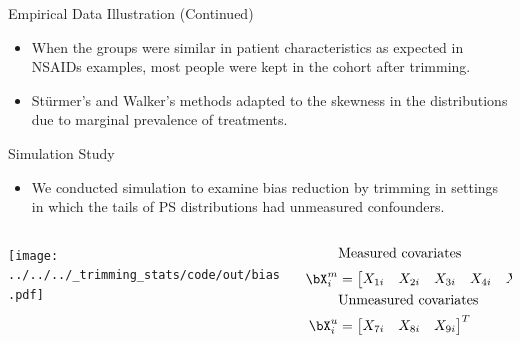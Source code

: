 \documentclass[final]{beamer}
\begin{document}
\begin{frame}[label={sec:org6cddcf1}]{}
\begin{columns}
\begin{column}[t]{0.48\columnwidth}
\begin{block}{Empirical Data Illustration (Continued)}
\begin{exampleblock}{}
\large
\begin{itemize}
\item When the groups were similar in patient characteristics as expected in NSAIDs examples, most people were kept in the cohort after trimming.
\item Stürmer's and Walker's methods adapted to the skewness in the distributions due to marginal prevalence of treatments.
\end{itemize}
\end{exampleblock}
\end{block}

\begin{block}{Simulation Study}
\large
\begin{itemize}
\item We conducted simulation to examine bias reduction by trimming in settings in which the tails of PS distributions had unmeasured confounders.
\end{itemize}

\vspace{-2cm}
\begin{exampleblock}{}
\begin{columns}
\begin{column}{0.7\columnwidth}
\begin{center}
\texttt{[image: ../../../\_trimming\_stats/code/out/bias.pdf]}
\end{center}
\end{column}

\begin{column}{0.3\columnwidth}
\tiny
\begin{align*}
  &\text{Measured covariates}\\
  \bX_{i}^{m} &= \begin{bmatrix}
    X_{1i} & X_{2i} & X_{3i} & X_{4i} & X_{5i} & X_{6i} \\
  \end{bmatrix}^{T}\\
  &\text{Unmeasured covariates}\\
  \bX_{i}^{u} &= \begin{bmatrix}
    X_{7i} & X_{8i} & X_{9i}\\
  \end{bmatrix}^{T}
\end{align*}


\end{column}
\end{columns}
\end{exampleblock}
\end{block}
\end{column}
\end{columns}
\end{frame}
\end{document}
